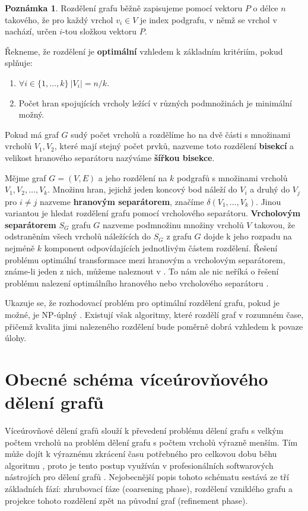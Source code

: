 \documentclass{ctuthesis}
\theoremstyle{plain}
\theoremstyle{definition}
\newtheorem{remark}{Poznámka}
\begin{document}
\begin{remark}
  Rozdělení grafu běžně zapisujeme pomocí vektoru $P$ o délce $n$ takového, že pro každý vrchol $v_i \in V$ je index podgrafu, v němž se vrchol v nachází, určen $i$-tou složkou vektoru $P$.  
\end{remark}

Řekneme, že rozdělení je \textbf{optimální} vzhledem k základním kritériím, pokud splňuje:
\begin{enumerate}
  \item $\forall i \in \{1, \ldots, k \} \ |V_i|=n/k$.
  \item Počet hran spojujících vrcholy ležící v různých podmnožinách je minimální možný.
\end{enumerate}

Pokud má graf $G$ sudý počet vrcholů a rozdělíme ho na dvě části s množinami vrcholů $V_1, V_2$, které mají stejný počet prvků, nazveme toto rozdělení \textbf{bisekcí} a velikost hranového separátoru nazýváme \textbf{šířkou bisekce}.

Mějme graf $G=(V,E)$ a jeho rozdělení na $k$ podgrafů s množinami vrcholů $V_1, V_2, \ldots, V_k$. Množinu hran, jejichž jeden koncový bod náleží do $V_i$ a druhý do $V_j$ pro $i \neq j$ nazveme \textbf{hranovým separátorem}, značíme $\delta(V_1,\ldots,V_k)$. Jinou variantou je hledat rozdělení grafu pomocí vrcholového separátoru.
\textbf{Vrcholovým separátorem} $S_G$ grafu $G$ nazveme podmnožinu množiny vrcholů $V$ takovou, že odstraněním všech vrcholů náležících do $S_G$ z grafu $G$ dojde k jeho rozpadu na nejméně $k$ komponent odpovídajících jednotlivým částem rozdělení. Řešení problému optimální transformace mezi hranovým a vrcholovým separátorem, známe-li jeden z nich, můžeme naleznout v \cite{pofa:90}. To nám ale nic neříká o řešení problému nalezení optimálního hranového nebo vrcholového separátoru \cite{liu:89}.

Ukazuje se, že rozhodovací problém pro optimální rozdělení grafu, pokud je možné, je NP-úplný \cite{gajo:79}. Existují však algoritmy, které rozdělí graf v rozumném čase, přičemž kvalita jimi nalezeného rozdělení bude poměrně dobrá \cite{lita:79} vzhledem k povaze úlohy.

\section{Obecné schéma víceúrovňového dělení grafů}
\label{multilevel}

Víceúrovňové dělení grafů slouží k převedení problému dělení grafu s velkým počtem vrcholů na problém dělení grafu s počtem vrcholů výrazně menším. Tím může dojít k výraznému zkrácení času potřebného pro celkovou dobu běhu algoritmu \cite{kaku:98}, proto je tento postup využíván v profesionálních softwarových nástrojích pro dělení grafů \cite{lehe:95, hele:95}. Nejobecnější popis tohoto schématu sestává ze tří základních fází: zhrubovací fáze (coarsening phase), rozdělení vzniklého grafu a projekce tohoto rozdělení zpět na původní graf (refinement phase).
\end{document}
